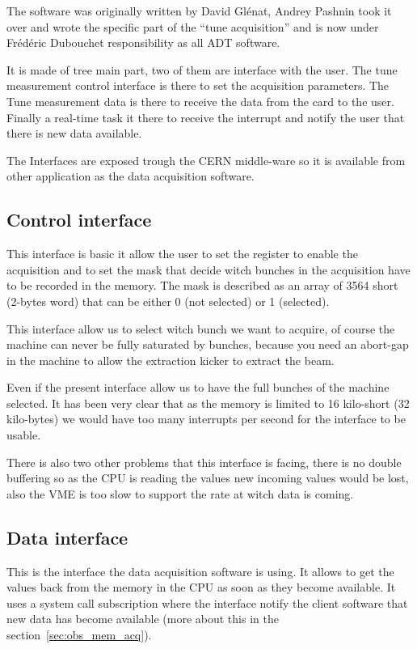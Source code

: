 The software was originally written by David Gl{\'e}nat, Andrey Pashnin took it over and wrote the specific part of the ``tune acquisition'' and is now under Fr{\'e}d{\'e}ric Dubouchet responsibility as all \gls{ADT} software.

It is made of tree main part, two of them are interface with the user. The tune measurement control interface is there to set the acquisition parameters. The Tune measurement data is there to receive the data from the card to the user. Finally a real-time task it there to receive the interrupt and notify the user that there is new data available.

The Interfaces are exposed trough the \gls{CERN} middle-ware so it is available from other application as the data acquisition software.

\subsection{Control interface}

This interface is basic it allow the user to set the register to enable the acquisition and to set the mask that decide witch bunches in the acquisition have to be recorded in the memory. The mask is described as an array of 3564 short (2-bytes word) that can be either 0 (not selected) or 1 (selected).

This interface allow us to select witch bunch we want to acquire, of course the machine can never be fully saturated by bunches, because you need an abort-gap in the machine to allow the extraction kicker to extract the beam.

Even if the present interface allow us to have the full bunches of the machine selected. It has been very clear that as the memory is limited to 16 kilo-short (32 kilo-bytes) we would have too many interrupts per second for the interface to be usable.

There is also two other problems that this interface is facing, there is no double buffering so as the CPU is reading the values new incoming values would be lost, also the \gls{VME} is too slow to support the rate at witch data is coming.

\subsection{Data interface}

This is the interface the data acquisition software is using. It allows to get the values back from the memory in the \gls{CPU} as soon as they become available. It uses a system call subscription where the interface notify the client software that new data has become available (more about this in the section~\ref{sec:obs_mem_acq}).

